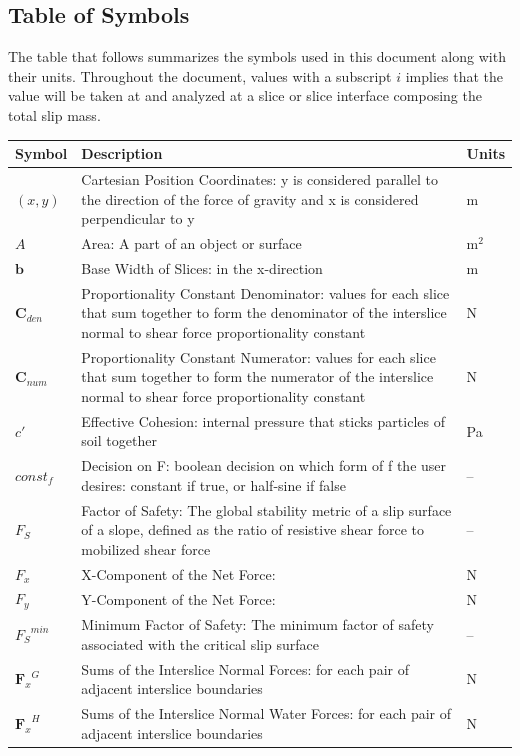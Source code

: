 \documentclass[12pt]{article}
\begin{document}
\subsection{Table of Symbols}
\label{Sec:ToS}
The table that follows summarizes the symbols used in this document along with their units. Throughout the document, values with a subscript $i$ implies that the value will be taken at and analyzed at a slice or slice interface composing the total slip mass.
\begin{longtabu}{l X[l] l}
\toprule
Symbol & Description & Units
\\
\midrule
\endhead
$(x,y)$ & Cartesian Position Coordinates: y is considered parallel to the direction of the force of gravity and x is considered perpendicular to y & m
\\
$A$ & Area: A part of an object or surface & $\text{m}^{2}$
\\
$\mathbf{b}$ & Base Width of Slices: in the x-direction & m
\\
${\mathbf{C}_{den}}$ & Proportionality Constant Denominator: values for each slice that sum together to form the denominator of the interslice normal to shear force proportionality constant & N
\\
${\mathbf{C}_{num}}$ & Proportionality Constant Numerator: values for each slice that sum together to form the numerator of the interslice normal to shear force proportionality constant & N
\\
$c'$ & Effective Cohesion: internal pressure that sticks particles of soil together & Pa
\\
$const_f$ & Decision on F: boolean decision on which form of f the user desires: constant if true, or half-sine if false & --
\\
${F_{S}}$ & Factor of Safety: The global stability metric of a slip surface of a slope, defined as the ratio of resistive shear force to mobilized shear force & --
\\
${F_{x}}$ & X-Component of the Net Force:  & N
\\
${F_{y}}$ & Y-Component of the Net Force:  & N
\\
${{F_{S}}^{min}}$ & Minimum Factor of Safety: The minimum factor of safety associated with the critical slip surface & --
\\
${{\mathbf{F}_{x}}^{G}}$ & Sums of the Interslice Normal Forces: for each pair of adjacent interslice boundaries & N
\\
${{\mathbf{F}_{x}}^{H}}$ & Sums of the Interslice Normal Water Forces: for each pair of adjacent interslice boundaries & N

\end{longtabu}
\end{document}
